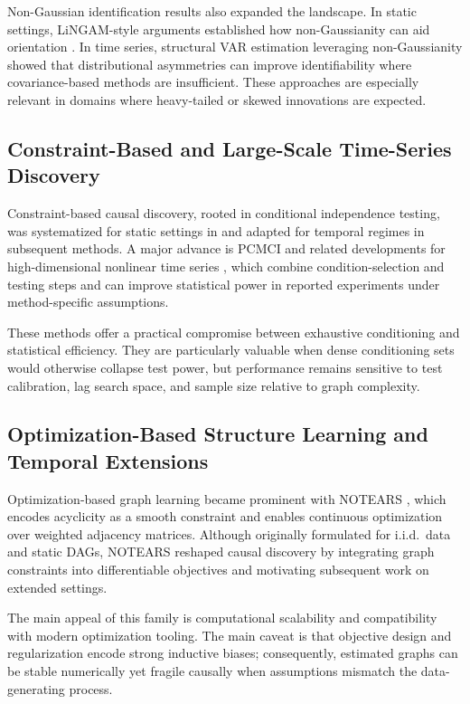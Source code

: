 \documentclass[11pt]{article}
\begin{document}
Non-Gaussian identification results also expanded the landscape. In static settings, LiNGAM-style arguments established how non-Gaussianity can aid orientation \citep{shimizu2006}. In time series, structural VAR estimation leveraging non-Gaussianity \citep{hyvarinen2010} showed that distributional asymmetries can improve identifiability where covariance-based methods are insufficient. These approaches are especially relevant in domains where heavy-tailed or skewed innovations are expected.

\subsection{Constraint-Based and Large-Scale Time-Series Discovery}
Constraint-based causal discovery, rooted in conditional independence testing, was systematized for static settings in \citet{spirtes2000} and adapted for temporal regimes in subsequent methods. A major advance is PCMCI and related developments for high-dimensional nonlinear time series \citep{runge2019}, which combine condition-selection and testing steps and can improve statistical power in reported experiments under method-specific assumptions.

These methods offer a practical compromise between exhaustive conditioning and statistical efficiency. They are particularly valuable when dense conditioning sets would otherwise collapse test power, but performance remains sensitive to test calibration, lag search space, and sample size relative to graph complexity.

\subsection{Optimization-Based Structure Learning and Temporal Extensions}
Optimization-based graph learning became prominent with NOTEARS \citep{zheng2018}, which encodes acyclicity as a smooth constraint and enables continuous optimization over weighted adjacency matrices. Although originally formulated for i.i.d.\ data and static DAGs, NOTEARS reshaped causal discovery by integrating graph constraints into differentiable objectives and motivating subsequent work on extended settings.

The main appeal of this family is computational scalability and compatibility with modern optimization tooling. The main caveat is that objective design and regularization encode strong inductive biases; consequently, estimated graphs can be stable numerically yet fragile causally when assumptions mismatch the data-generating process.
\end{document}
